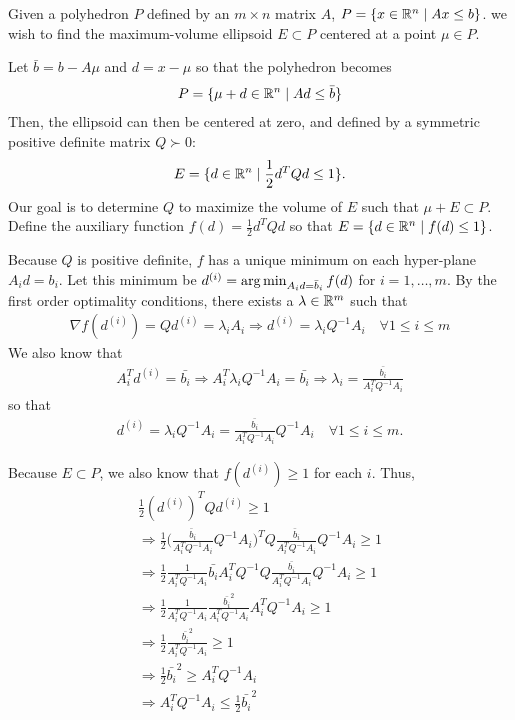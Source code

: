 Given a polyhedron $P$ defined by an $m \times n$ matrix $A$, $P = \{ x \in \mathbb R^n\; | \;  Ax \le b \}$.
we wish to find the maximum-volume ellipsoid $E \subset P$ centered at a point $\mu \in P$.

Let $\bar{b} = b - A\mu$ and $d = x - \mu$ so that the polyhedron becomes
\begin{align*}
P = \{ \mu + d \in \mathbb R^n \; | \;  Ad \le \bar{b} \}
\end{align*}
Then, the ellipsoid can then be centered at zero, and defined by a symmetric positive definite matrix $Q \succ 0$:
\begin{align*}
E = \{ d \in \mathbb R^n \; | \; \frac 1 2 d^T Q d \le 1 \}.
\end{align*}
Our goal is to determine $Q$ to maximize the volume of $E$ such that $\mu + E \subset P$.
Define the auxiliary function $f(d) = \frac 1 2 d^T Q d$ so that $E = \{ d \in \mathbb R^n\; | \; f(d) \le 1 \}$.

Because $Q$ is positive definite, $f$ has a unique minimum on each hyper-plane $A_i d = b_i$.
Let this minimum be $d^{(i)} = \operatorname*{arg\,min}_{A_id =\bar{b}_i} f(d)$ for $i=1,\ldots,m$.
By the first order optimality conditions, there exists a $\lambda \in \mathbb R^m$ such that
\begin{align*}
\nabla f(d^{(i)}) = Q d^{(i)} = \lambda_i A_i 
\Longrightarrow d^{(i)} = \lambda_i Q^{-1}A_i \quad \forall 1\le i\le m
\end{align*}
We also know that
\begin{align*}
A_i^T d^{(i)} = \bar{b_i} \Longrightarrow
A_i^T \lambda_i Q^{-1}A_i = \bar{b_i} \Longrightarrow
\lambda_i = \frac {\bar{b_i}}{A_i^T  Q^{-1}A_i}
\end{align*}
so that
\begin{align*}
d^{(i)} = \lambda_i Q^{-1}A_i = \frac {\bar{b_i}}{A_i^T  Q^{-1}A_i}  Q^{-1}A_i \quad \forall 1\le i\le m.
\end{align*}

Because $E \subset P$, we also know that $f(d^{(i)}) \ge 1$ for each $i$. Thus,
\begin{align*}
\frac 1 2 (d^{(i)})^{T} Q d^{(i)} \ge 1 \\
\Longrightarrow \frac 1 2 \bigg(\frac {\bar{b}_i}{A_i^T  Q^{-1}A_i}  Q^{-1}A_i\bigg)^{T} Q \frac {\bar{b}_i}{A_i^T  Q^{-1}A_i}  Q^{-1}A_i \ge 1 \\
\Longrightarrow \frac 1 2 \frac {1}{A_i^T  Q^{-1}A_i}  \bar{b_i} A_i^T Q^{-1} Q \frac {\bar{b_i}}{A_i^T  Q^{-1}A_i}  Q^{-1}A_i \ge 1 \\
\Longrightarrow \frac 1 2 \frac {1}{A_i^T  Q^{-1}A_i}  \frac {\bar{b_i}^2}{A_i^T  Q^{-1}A_i}  A_i^T Q^{-1}A_i \ge 1 \\
\Longrightarrow \frac 1 2  \frac {\bar{b_i}^2}{A_i^T  Q^{-1}A_i} \ge 1 \\
\Longrightarrow \frac 1 2 \bar{b_i}^2\ge A_i^T  Q^{-1}A_i \\
\Longrightarrow A_i^T  Q^{-1}A_i \le \frac 1 2 \bar{b_i}^2
\end{align*}

